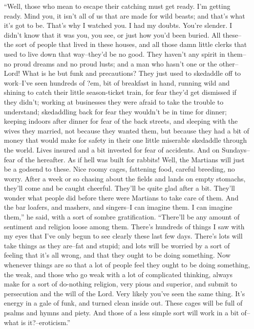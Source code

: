 ``Well, those who mean to escape their catching must get ready. I'm
getting ready. Mind you, it isn't all of us that are made for wild
beasts; and that's what it's got to be. That's why I watched you. I
had my doubts. You're slender. I didn't know that it was you, you
see, or just how you'd been buried. All these--the sort of people
that lived in these houses, and all those damn little clerks that
used to live down that way--they'd be no good. They haven't any
spirit in them--no proud dreams and no proud lusts; and a man who
hasn't one or the other--Lord! What is he but funk and precautions?
They just used to skedaddle off to work--I've seen hundreds of ?em,
bit of breakfast in hand, running wild and shining to catch their
little season-ticket train, for fear they'd get dismissed if they
didn't; working at businesses they were afraid to take the trouble
to understand; skedaddling back for fear they wouldn't be in time
for dinner; keeping indoors after dinner for fear of the back
streets, and sleeping with the wives they married, not because they
wanted them, but because they had a bit of money that would make
for safety in their one little miserable skedaddle through the
world. Lives insured and a bit invested for fear of accidents. And
on Sundays--fear of the hereafter. As if hell was built for
rabbits! Well, the Martians will just be a godsend to these. Nice
roomy cages, fattening food, careful breeding, no worry. After a
week or so chasing about the fields and lands on empty stomachs,
they'll come and be caught cheerful. They'll be quite glad after a
bit. They'll wonder what people did before there were Martians to
take care of them. And the bar loafers, and mashers, and singers--I
can imagine them. I can imagine them,'' he said, with a sort of
sombre gratification. ``There'll be any amount of sentiment and
religion loose among them. There's hundreds of things I saw with my
eyes that I've only begun to see clearly these last few days.
There's lots will take things as they are--fat and stupid; and lots
will be worried by a sort of feeling that it's all wrong, and that
they ought to be doing something. Now whenever things are so that a
lot of people feel they ought to be doing something, the weak, and
those who go weak with a lot of complicated thinking, always make
for a sort of do-nothing religion, very pious and superior, and
submit to persecution and the will of the Lord. Very likely you've
seen the same thing. It's energy in a gale of funk, and turned
clean inside out. These cages will be full of psalms and hymns and
piety. And those of a less simple sort will work in a bit of--what
is it?--eroticism.''

